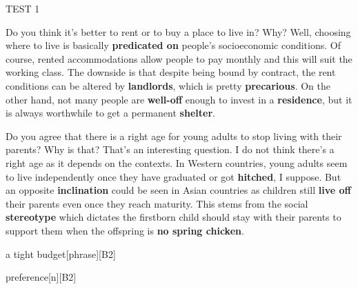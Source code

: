 \begin{glossarymc}[Cambridge 11]
\begin{test}{TEST 1}
    \begin{qa}{Do you think it’s better to rent or to buy a place to live in? Why?}
    Well, choosing where to live is basically \textbf{predicated on} people’s socioeconomic conditions. Of course, rented accommodations allow people to pay monthly and this will suit the working class. The downside is that despite being bound by contract, the rent conditions can be altered by \textbf{landlords}, which is pretty \textbf{precarious}. On the other hand, not many people are \textbf{well-off} enough to invest in a \textbf{residence}, but it is always worthwhile to get a permanent \textbf{shelter}.
    \end{qa}

    \begin{qa}{Do you agree that there is a right age for young adults to stop living with their parents? Why is that?}
    That’s an interesting question. I do not think there’s a right age as it depends on the contexts. In Western countries, young adults seem to live independently once they have graduated or got \textbf{hitched}, I suppose. But an opposite \textbf{inclination} could be seen in Asian countries as children still \textbf{live off} their parents even once they reach maturity. This stems from the social \textbf{stereotype} which dictates the firstborn child should stay with their parents to support them when the offspring is \textbf{no spring chicken}.
    \end{qa}

        \begin{VocabExplain}[Part 3]
            \begin{ExplainCard}{a tight budget}[phrase][B2]
            \end{ExplainCard}

            \begin{ExplainCard}{preference}[n][B2]
            \end{ExplainCard}


\end{VocabExplain}
\end{test}
\end{glossarymc}
